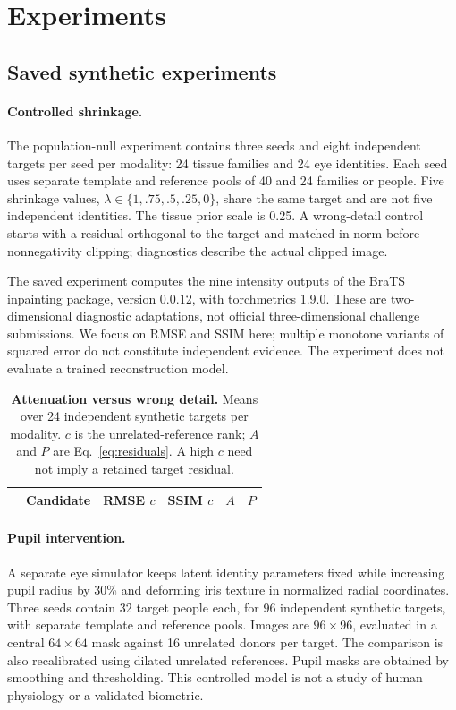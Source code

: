 \documentclass[10pt,twocolumn,letterpaper]{article}
\begin{document}
\section{Experiments}
\subsection{Saved synthetic experiments}
\paragraph{Controlled shrinkage.}
The population-null experiment contains three seeds and eight independent targets per seed per modality: 24 tissue families and 24 eye identities. Each seed uses separate template and reference pools of 40 and 24 families or people. Five shrinkage values, $\lambda\in\{1,.75,.5,.25,0\}$, share the same target and are not five independent identities. The tissue prior scale is 0.25. A wrong-detail control starts with a residual orthogonal to the target and matched in norm before nonnegativity clipping; diagnostics describe the actual clipped image.

The saved experiment computes the nine intensity outputs of the BraTS inpainting package, version 0.0.12, with torchmetrics 1.9.0. These are two-dimensional diagnostic adaptations, not official three-dimensional challenge submissions. We focus on RMSE and SSIM here; multiple monotone variants of squared error do not constitute independent evidence. The experiment does not evaluate a trained reconstruction model.

\begin{table}[t]
\centering
\caption{\textbf{Attenuation versus wrong detail.} Means over 24 independent synthetic targets per modality. $c$ is the unrelated-reference rank; $A$ and $P$ are Eq.~\ref{eq:residuals}. A high $c$ need not imply a retained target residual.}
\label{tab:null}
\footnotesize
\setlength{\tabcolsep}{3pt}
\begin{tabular}{@{}llrrrr@{}}
\toprule
 & Candidate & RMSE $c$ & SSIM $c$ & $A$ & $P$ \\
\midrule

\end{tabular}
\end{table}

\paragraph{Pupil intervention.}
A separate eye simulator keeps latent identity parameters fixed while increasing pupil radius by 30\% and deforming iris texture in normalized radial coordinates. Three seeds contain 32 target people each, for 96 independent synthetic targets, with separate template and reference pools. Images are $96\times96$, evaluated in a central $64\times64$ mask against 16 unrelated donors per target. The comparison is also recalibrated using dilated unrelated references. Pupil masks are obtained by smoothing and thresholding. This controlled model is not a study of human physiology or a validated biometric.
\end{document}
